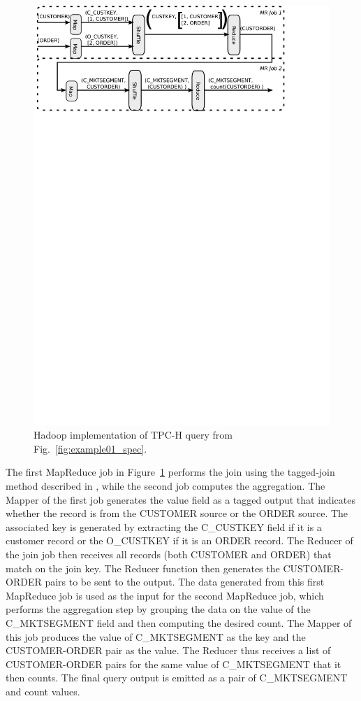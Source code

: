 \begin{figure} [htb!]
  \centering
  \includegraphics[scale=1]{images/tpch-mr}
  \caption{Hadoop implementation of TPC-H query from Fig.~\ref{fig:example01_spec}.}
  \label{fig:tpchmr}
\end{figure}

The first MapReduce job in Figure~\ref{fig:tpchmr} performs the join using the tagged-join method described in \cite{MapReduceBenchmark}, while the second job computes
the aggregation.  The Mapper of the first job generates the value field as a tagged output that indicates whether the record is
from the CUSTOMER source or the ORDER source. The associated key is generated by extracting the C\_CUSTKEY field if it is a customer record or the O\_CUSTKEY if it
is an ORDER record.
The Reducer of the join job then receives all records (both CUSTOMER and ORDER) that match on the join key. The Reducer function then generates the CUSTOMER-ORDER pairs
to be sent to the output.
The data generated from this first MapReduce job is used as the input for the second MapReduce job, which performs the aggregation step by grouping
the data on the value of the C\_MKTSEGMENT field and then computing the desired count. The Mapper of this job produces the value of C\_MKTSEGMENT as the key and the
CUSTOMER-ORDER pair as the value. The Reducer thus receives
a list of CUSTOMER-ORDER pairs for the same value of C\_MKTSEGMENT that it then counts. The final query output is emitted as a pair of C\_MKTSEGMENT and count values.

